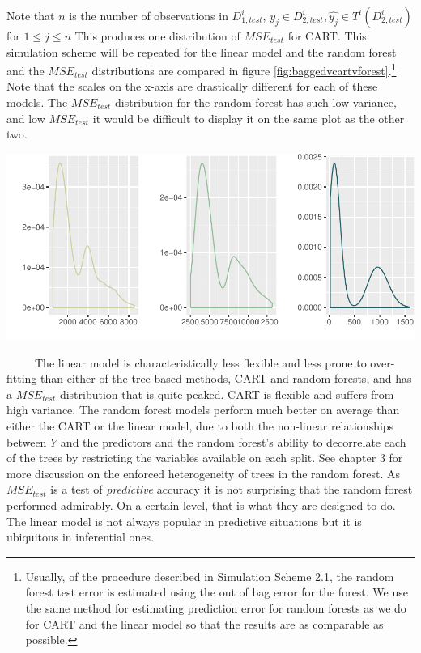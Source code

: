 \documentclass[12pt,twoside]{reedthesis}
\let\origfigure\figure
\let\endorigfigure\endfigure
\renewenvironment{figure}[1][2] {
    \expandafter\origfigure\expandafter[H]
} {
    \endorigfigure
}
\begin{document}
  Note that \(n\) is the number of observations in \(D_{1, test}^i\),
  \(y_j \in D_{2, test}^i, \hat{y_j} \in T^i(D_{2, test}^i)\) for
  \(1 \leq j \leq n\) This produces one distribution of \(MSE_{test}\) for
  CART. This simulation scheme will be repeated for the linear model and
  the random forest and the \(MSE_{test}\) distributions are compared in
  figure \ref{fig:baggedvcartvforest}.\footnote{Usually, of the procedure
    described in Simulation Scheme 2.1, the random forest test error is
    estimated using the out of bag error for the forest. We use the same
    method for estimating prediction error for random forests as we do for
    CART and the linear model so that the results are as comparable as
    possible.} Note that the scales on the x-axis are drastically
  different for each of these models. The \(MSE_{test}\) distribution for
  the random forest has such low variance, and low \(MSE_{test}\) it would
  be difficult to display it on the same plot as the other two.
  
  \begin{figure}[htbp]
  \centering
  \includegraphics{Thesis_files/figure-latex/unnamed-chunk-20-1.pdf}
  \caption{\label{fig:unnamed-chunk-20}\label{fig:baggedvcartvforest}The
  simulated MSE distributions of CART, linear model, and the random forest
  on D2}
  \end{figure}
  
  ~~~~~The linear model is characteristically less flexible and less prone
  to over-fitting than either of the tree-based methods, CART and random
  forests, and has a \(MSE_{test}\) distribution that is quite peaked.
  CART is flexible and suffers from high variance. The random forest
  models perform much better on average than either the CART or the linear
  model, due to both the non-linear relationships between \(Y\) and the
  predictors and the random forest's ability to decorrelate each of the
  trees by restricting the variables available on each split. See chapter
  3 for more discussion on the enforced heterogeneity of trees in the
  random forest. As \(MSE_{test}\) is a test of \emph{predictive} accuracy
  it is not surprising that the random forest performed admirably. On a
  certain level, that is what they are designed to do. The linear model is
  not always popular in predictive situations but it is ubiquitous in
  inferential ones.
  
\end{document}
